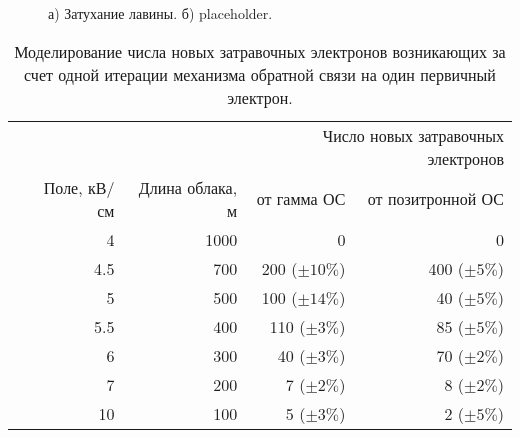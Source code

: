 \begin{figure}[t]
    \begin{center}
        \begin{minipage}[h]{0.49\linewidth}
        \end{minipage}
        \hfill
        \begin{minipage}[h]{0.49\linewidth}
        \end{minipage}
        \caption{а) Затухание лавины. б) placeholder.}
    \end{center}
    \label{fig:storm:dwyer2003}
\end{figure}

\begin{table}[h]
    \centering
    \begin{tabular}{crrrr}
        \hline
        & & & \multicolumn{2}{r}{Число новых затравочных электронов} \\
        & Поле, кВ/см &  Длина облака, м  & от гамма ОС & от позитронной ОС \\
        \hline
        & 4   &  1000&  0 & 0  \\
        & 4.5 &  700 &  200 ($\pm 10 \%$)& 400 ($\pm 5 \%$) \\
        & 5   &  500 &  100 ($\pm 14 \%$)& 40 ($\pm 5 \%$) \\
        & 5.5 &  400 &  110 ($\pm 3 \%$)& 85 ($\pm 5 \%$) \\
        & 6   &  300 &  40 ($\pm 3 \%$)& 70 ($\pm 2 \%$) \\
        & 7   &  200 &  7 ($\pm 2 \%$)& 8 ($\pm 2 \%$) \\
        & 10  &  100 &  5 ($\pm 3 \%$)& 2 ($\pm 5 \%$) \\
        \hline
    \end{tabular}
    \caption{Моделирование числа новых затравочных электронов возникающих за счет одной итерации механизма обратной связи на один первичный электрон.}
    \label{tab:storm:dwyer}
\end{table}
